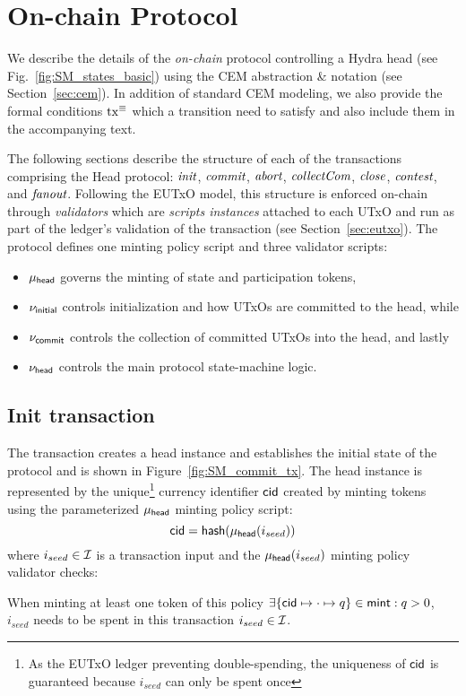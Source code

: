 \section{On-chain Protocol}\label{sec:on-chain}


We describe the details of the \emph{on-chain} protocol controlling a
Hydra head (see Fig.~\ref{fig:SM_states_basic}) using the CEM abstraction \&
notation (see Section~\ref{sec:cem}). In addition of standard CEM modeling, we
also provide the formal conditions $\mathrm{tx}^\equiv$ which a transition need to
satisfy and also include them in the accompanying text.

The following sections describe the structure of each of the transactions
comprising the Head protocol: $\textit{init}{}$, $\textit{commit}{}$, $\textit{abort}{}$,
$\textit{collectCom}{}$, $\textit{close}{}$, $\textit{contest}{}$, and $\textit{fanout}{}$. Following
the EUTxO model, this structure is enforced on-chain through \emph{validators}
which are \emph{scripts instances} attached to each UTxO and run as part of the
ledger's validation of the transaction (see Section~\ref{sec:eutxo}). The
protocol defines one minting policy script and three validator scripts:
\begin{itemize}
  \item $\mu_\mathsf{head}$ governs the minting of state and participation tokens,
  \item $\nu_\mathsf{initial}$ controls initialization and how UTxOs are committed to the head, while
  \item $\nu_\mathsf{commit}$ controls the collection of committed UTxOs into the head, and lastly
  \item $\nu_\mathsf{head}$ controls the main protocol state-machine logic.
\end{itemize}

\subsection{Init transaction}\label{sec:init-tx}

The \mtxInit{} transaction creates a head instance and establishes the initial
state of the protocol and is shown in Figure~\ref{fig:SM_commit_tx}. The head
instance is represented by the unique\footnote{As the EUTxO ledger preventing
  double-spending, the uniqueness of $\mathsf{cid}$ is guaranteed because $i_{seed}$ can
  only be spent once} currency identifier $\mathsf{cid}$ created by minting tokens using
the parameterized $\mu_\mathsf{head}$ minting policy script:
\[
  \mathsf{cid} = \mathsf{hash}(\mu_\mathsf{head}(i_{seed}))
\]
\noindent where $i_{seed} \in \mathcal{I}$ is a transaction input and the
$\mu_\mathsf{head}(i_{seed})$ minting policy validator checks:
\begin{menumerate}
  \item When minting at least one token of this policy
  $\exists \{\mathsf{cid} \mapsto \cdot \mapsto q\} \in \mathsf{mint} : q > 0$, $i_{seed}$ needs to be spent in this transaction
  $i_{seed} \in \mathcal{I}$.
\end{menumerate}

